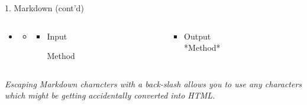 \documentclass[14pt, aspectratio=169, sectionpage=simple, xclolor=table]{beamer}
\begin{document}
\begin{frame}[fragile, t]{1. Markdown (cont'd)}
\begin{itemize}
\item {}
\begin{itemize}
\item[] 


\begin{columns}
\begin{column}{0.45\textwidth}
\vspace{1cm}
\begin{itemize}
\item Input
\\
\begin{code11}
\*Method\*
\end{code11}
\end{itemize}
\end{column}%
\hfill
\begin{column}{0.45\textwidth}
\vspace{0.9cm}
\begin{itemize}
\item Output
\\
*Method*
\end{itemize}
\end{column}%
\end{columns}

\end{itemize}
\end{itemize}



\textit{Escaping Markdown characters with a back-slash allows you to use any characters which might be getting accidentally converted into HTML.}



\end{frame}
\end{document}
